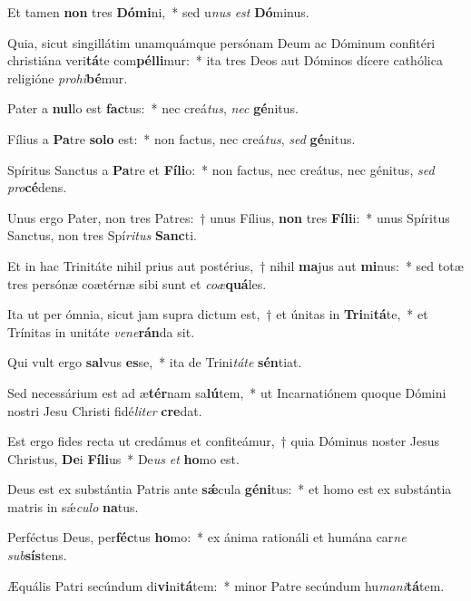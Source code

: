 \item Et tamen \textbf{non} tres \textbf{Dó}\textbf{mi}ni,~* sed u\textit{nus} \textit{est} \textbf{Dó}minus.
\item Quia, sicut singillátim unamquámque persónam Deum ac Dóminum confitéri christiána veri\textbf{tá}te com\textbf{pél}\textbf{li}mur:~* ita tres Deos aut Dóminos dícere cathólica religióne \textit{pro}\textit{hi}\textbf{bé}mur.
\item Pater a \textbf{nul}lo est \textbf{fac}tus:~* nec creá\textit{tus}, \textit{nec} \textbf{gé}nitus.
\item Fílius a \textbf{Pa}tre \textbf{so}\textbf{lo} est:~* non factus, nec creá\textit{tus}, \textit{sed} \textbf{gé}nitus.
\item Spíritus Sanctus a \textbf{Pa}tre et \textbf{Fí}\textbf{li}o:~* non factus, nec creátus, nec génitus, \textit{sed} \textit{pro}\textbf{cé}dens.
\item Unus ergo Pater, non tres Patres:~† unus Fílius, \textbf{non} tres \textbf{Fí}\textbf{li}i:~* unus Spíritus Sanctus, non tres Spí\textit{ri}\textit{tus} \textbf{Sanc}ti.
\item Et in hac Trinitáte nihil prius aut postérius,~† nihil \textbf{ma}jus aut \textbf{mi}nus:~* sed totæ tres persónæ coætérnæ sibi sunt et \textit{co}\textit{æ}\textbf{quá}les.
\item Ita ut per ómnia, sicut jam supra dictum est,~† et únitas in \textbf{Tri}ni\textbf{tá}te,~* et Trínitas in unitáte \textit{ve}\textit{ne}\textbf{rán}da sit.
\item Qui vult ergo \textbf{sal}vus \textbf{es}se,~* ita de Trini\textit{tá}\textit{te} \textbf{sén}tiat.
\item Sed necessárium est ad æ\textbf{tér}nam sa\textbf{lú}tem,~* ut Incarnatiónem quoque Dómini nostri Jesu Christi fidé\textit{li}\textit{ter} \textbf{cre}dat.
\item Est ergo fides recta ut credámus et confiteámur,~† quia Dóminus noster Jesus Christus, \textbf{De}i \textbf{Fí}\textbf{li}us~* De\textit{us} \textit{et} \textbf{ho}mo est.
\item Deus est ex substántia Patris ante \textbf{sǽ}cula \textbf{gé}\textbf{ni}tus:~* et homo est ex substántia matris in sǽ\textit{cu}\textit{lo} \textbf{na}tus.
\item Perféctus Deus, per\textbf{féc}tus \textbf{ho}mo:~* ex ánima rationáli et humána car\textit{ne} \textit{sub}\textbf{sís}tens.
\item Æquális Patri secúndum di\textbf{vi}ni\textbf{tá}tem:~* minor Patre secúndum hu\textit{ma}\textit{ni}\textbf{tá}tem.
